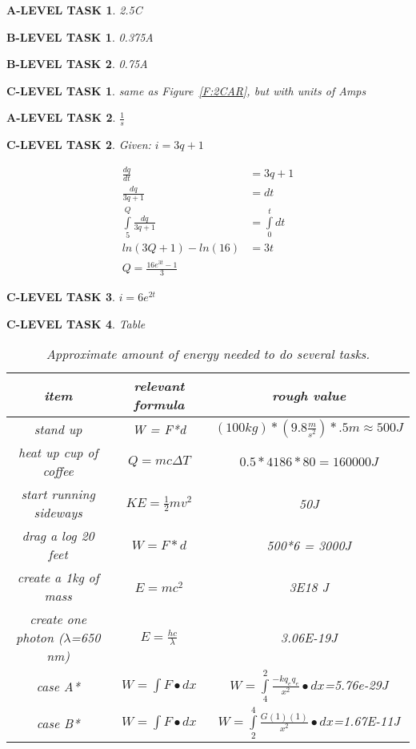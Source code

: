 \documentclass{book}
\numberwithin{equation}{section}
\newtheorem{alevel}{A-LEVEL TASK}
\newtheorem{blevel}{B-LEVEL TASK}
\newtheorem{clevel}{C-LEVEL TASK}
\theoremstyle{definition}
\begin{document}
\begin{alevel}2.5C\end{alevel}
\begin{blevel}0.375A\end{blevel}
\begin{blevel}0.75A\end{blevel}
\begin{clevel}same as Figure~\ref{F:2CAR}, but with units of Amps\end{clevel}
\begin{alevel}$\frac{1}{s}$\end{alevel}

\begin{clevel} Given: $i=3q+1$ \par
\begin{align*}
\frac{dq}{dt}&=3q+1\\
\frac{dq}{3q+1}&=dt\\
\int\limits_5^Q{\frac{dq}{3q+1}}&=\int\limits_0^t{dt}\\
ln(3Q+1)-ln(16)&=3t\\
Q=\frac{16e^{3t}-1}{3}
\end{align*}
\end{clevel}
\begin{clevel}$i=6e^{2t}$\end{clevel}

\begin{clevel} Table\par
\begin{table}[H]
\begin{center}
\begin{tabular}{|c| c| c|} \hline
item & relevant formula	& rough value \\ \hline
stand up	& W = F*d	& $(100kg)*(9.8 \frac{m}{s^2})*.5 m \approx 500J$\\ \hline
heat up cup of coffee &$Q=mc\Delta T$	& $0.5*4186*80=160000J$\\ \hline
start running sideways	&$KE=\frac{1}{2}mv^2$	&50J\\ \hline
drag a log 20 feet	&$W=F*d$	&500*6 = 3000J\\ \hline
create a 1kg of mass	&$E=mc^2$	&3E18 J\\ \hline
create one photon ($\lambda$=650 nm)	&$E=\frac{hc}{\lambda}$	&3.06E-19J	\\ \hline
case A*			&$W=\int{F\bullet dx}$	&$W=\int\limits_4^2{\frac{-kq_eq_e}{x^2}\bullet dx}$=5.76e-29J\\ \hline
case B*			&$W=\int{F\bullet dx}$	&$W=\int\limits_2^4{\frac{G(1)(1)}{x^2}\bullet dx}$=1.67E-11J\\ \hline
\end{tabular}
\caption{Approximate amount of energy needed to do several tasks.}
\end{center}
\end{table}
\end{clevel}
\end{document}

